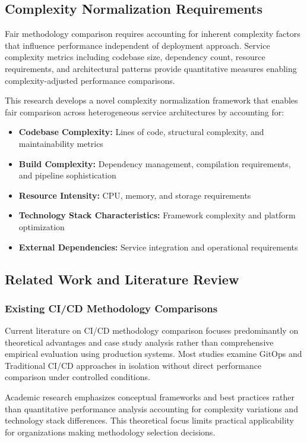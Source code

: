 \subsection{Complexity Normalization Requirements}

Fair methodology comparison requires accounting for inherent complexity factors that influence performance independent of deployment approach. Service complexity metrics including codebase size, dependency count, resource requirements, and architectural patterns provide quantitative measures enabling complexity-adjusted performance comparisons.

This research develops a novel complexity normalization framework that enables fair comparison across heterogeneous service architectures by accounting for:
\begin{itemize}
\item \textbf{Codebase Complexity:} Lines of code, structural complexity, and maintainability metrics
\item \textbf{Build Complexity:} Dependency management, compilation requirements, and pipeline sophistication
\item \textbf{Resource Intensity:} CPU, memory, and storage requirements
\item \textbf{Technology Stack Characteristics:} Framework complexity and platform optimization
\item \textbf{External Dependencies:} Service integration and operational requirements
\end{itemize}

\subsection{Related Work and Literature Review}

\subsubsection{Existing CI/CD Methodology Comparisons}

Current literature on CI/CD methodology comparison focuses predominantly on theoretical advantages and case study analysis rather than comprehensive empirical evaluation using production systems. Most studies examine GitOps and Traditional CI/CD approaches in isolation without direct performance comparison under controlled conditions.

Academic research emphasizes conceptual frameworks and best practices rather than quantitative performance analysis accounting for complexity variations and technology stack differences. This theoretical focus limits practical applicability for organizations making methodology selection decisions.

